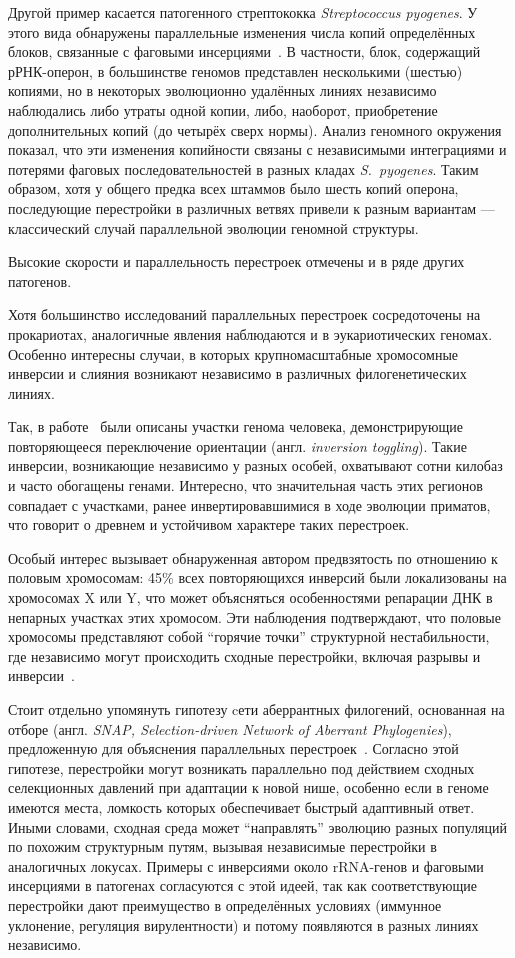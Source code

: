 Другой пример касается патогенного стрептококка \textit{Streptococcus pyogenes}.
У этого вида обнаружены параллельные изменения числа копий определённых блоков, связанные с фаговыми инсерциями~\cite{Shelyakin2019}.
В частности, блок, содержащий рРНК-оперон, в большинстве геномов представлен несколькими (шестью) копиями, но в некоторых эволюционно удалённых линиях независимо наблюдались либо утраты одной копии, либо, наоборот, приобретение дополнительных копий (до четырёх сверх нормы).
Анализ геномного окружения показал, что эти изменения копийности связаны с независимыми интеграциями и потерями фаговых последовательностей в разных кладах \textit{S.~pyogenes}.
Таким образом, хотя у общего предка всех штаммов было шесть копий оперона, последующие перестройки в различных ветвях привели к разным вариантам — классический случай параллельной эволюции геномной структуры.

Высокие скорости и параллельность перестроек отмечены и в ряде других патогенов.


Хотя большинство исследований параллельных перестроек сосредоточены на прокариотах, аналогичные явления наблюдаются и в эукариотических геномах.
Особенно интересны случаи, в которых крупномасштабные хромосомные инверсии и слияния возникают независимо в различных филогенетических линиях.

Так, в работе~\cite{Porubsky2022} были описаны участки генома человека, демонстрирующие повторяющееся переключение ориентации (англ. \textit{inversion toggling}).
Такие инверсии, возникающие независимо у разных особей, охватывают сотни килобаз и часто обогащены генами.
Интересно, что значительная часть этих регионов совпадает с участками, ранее инвертировавшимися в ходе эволюции приматов, что говорит о древнем и устойчивом характере таких перестроек.

Особый интерес вызывает обнаруженная автором предвзятость по отношению к половым хромосомам: 45\% всех повторяющихся инверсий были локализованы на хромосомах X или Y, что может объясняться особенностями репарации ДНК в непарных участках этих хромосом.
Эти наблюдения подтверждают, что половые хромосомы представляют собой ``горячие точки'' структурной нестабильности, где независимо могут происходить сходные перестройки, включая разрывы и инверсии~\cite{Porubsky2022}.

Стоит отдельно упомянуть гипотезу cети аберрантных филогений, основанная на отборе (англ. \textit{SNAP, Selection-driven Network of Aberrant Phylogenies}), предложенную для объяснения параллельных перестроек~\cite{Brandis2020}.
Согласно этой гипотезе, перестройки могут возникать параллельно под действием сходных селекционных давлений при адаптации к новой нише, особенно если в геноме имеются места, ломкость которых обеспечивает быстрый адаптивный ответ.
Иными словами, сходная среда может ``направлять'' эволюцию разных популяций по похожим структурным путям, вызывая независимые перестройки в аналогичных локусах.
Примеры с инверсиями около rRNA-генов и фаговыми инсерциями в патогенах согласуются с этой идеей, так как соответствующие перестройки дают преимущество в определённых условиях (иммунное уклонение, регуляция вирулентности) и потому появляются в разных линиях независимо.


